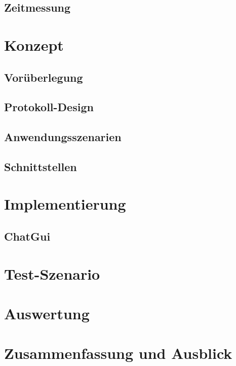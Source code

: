 \documentclass[
    11pt, %
    DIV=11,
    ngerman, %
    a4paper, %
    oneside, %
    titlepage, %
    parskip=half, %
    headings=normal, %
    listof=totoc, %
    bibliography=totoc, %
    index=totoc, %
    captions=tableheading, %
    final %
]{scrreprt}
\begin{document}
	\section{Zeitmessung}
		
	
\chapter{Konzept} \label{sec:Konzept}
	
	\section{Vorüberlegung} \label{sec:Vorueberlegung}
		
	\section{Protokoll-Design} \label{sec:ProtokolDesign}
		
	\section{Anwendungsszenarien}\label{sec:Anwendungsszenarien}
		
	\section{Schnittstellen}
		
	
\chapter{Implementierung} \label{sec:Implementierung}
	
	\section{ChatGui}
	
	
\chapter{Test-Szenario}	
	
	
\chapter{Auswertung}
	
	
\chapter{Zusammenfassung und Ausblick}
	
	
\end{document}
